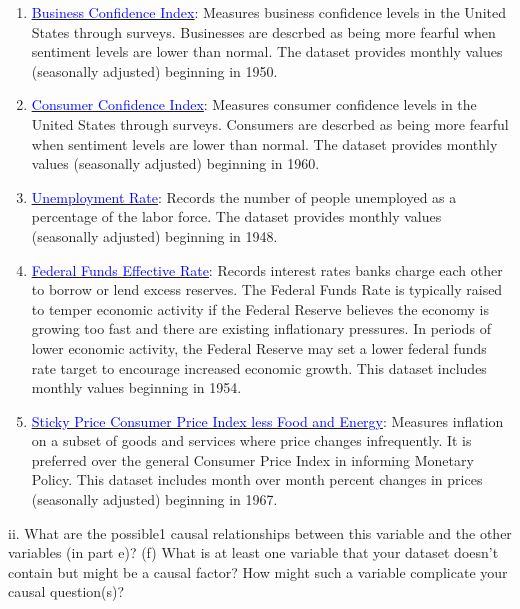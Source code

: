 \documentclass[11pt]{article}
\begin{document}
\begin{enumerate}[itemsep=0em,label={(\alph*)}]
\begin{enumerate}[itemsep=0em,label={\roman*.}]
    \item \href{https://fred.stlouisfed.org/series/BSCICP03USM665S}{\underline{\textcolor{blue}{Business Confidence Index}}}: Measures business confidence levels in the United States through surveys. Businesses are descrbed as being more fearful when sentiment levels are lower than normal. The dataset provides monthly values (seasonally adjusted) beginning in 1950.
    \item \href{https://fred.stlouisfed.org/series/CSCICP03USM665S}{\underline{\textcolor{blue}{Consumer Confidence Index}}}: Measures consumer confidence levels in the United States through surveys. Consumers are descrbed as being more fearful when sentiment levels are lower than normal. The dataset provides monthly values (seasonally adjusted) beginning in 1960.
    \item \href{https://fred.stlouisfed.org/series/UNRATE}{\underline{\textcolor{blue}{Unemployment Rate}}}: Records the number of people unemployed as a percentage of the labor force. The dataset provides monthly values (seasonally adjusted) beginning in 1948.
    \item \href{https://fred.stlouisfed.org/series/FEDFUNDS}{\underline{\textcolor{blue}{Federal Funds Effective Rate}}}: Records interest rates banks charge each other to borrow or lend excess reserves. The Federal Funds Rate is typically raised to temper economic activity if the Federal Reserve believes the economy is growing too fast and there are existing inflationary pressures. In periods of lower economic activity, the Federal Reserve may set a lower federal funds rate target to encourage increased economic growth. This dataset includes monthly values beginning in 1954.
    \item \href{https://fred.stlouisfed.org/series/CORESTICKM157SFRBATL}{\underline{\textcolor{blue}{Sticky Price Consumer Price Index less Food and Energy}}}: Measures inflation on a subset of goods and services where price changes infrequently. It is preferred over the general Consumer Price Index in informing Monetary Policy. This dataset includes month over month percent changes in prices (seasonally adjusted) beginning in 1967.
  \end{enumerate}
\end{enumerate}

ii. What are the possible1 causal relationships between this variable and the other variables (in part e)?
(f) What is at least one variable that your dataset doesn’t contain but might be a causal factor? How might such a variable complicate your causal question(s)?
\end{document}
